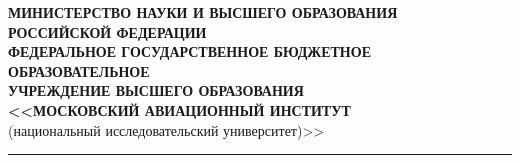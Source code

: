 \documentclass{article}
\begin{document}
\begin{center}


\begin{center}
\begin{minipage}{0.05\textwidth}%
    \resizebox{3cm}{!}{}
\end{minipage}
\hfill
\begin{minipage}{0.85\textwidth}\raggedleft
    \begin{center}
    \textbf{МИНИСТЕРСТВО НАУКИ И ВЫСШЕГО ОБРАЗОВАНИЯ\\ РОССИЙСКОЙ ФЕДЕРАЦИИ }\\
    \vspace{14pt}
    \textbf{ФЕДЕРАЛЬНОЕ ГОСУДАРСТВЕННОЕ БЮДЖЕТНОЕ ОБРАЗОВАТЕЛЬНОЕ\\
        УЧРЕЖДЕНИЕ ВЫСШЕГО ОБРАЗОВАНИЯ\\
    <<МОСКОВСКИЙ АВИАЦИОННЫЙ ИНСТИТУТ}\\ 
    (национальный исследовательский университет)>>
\end{center}
\end{minipage}
\end{center}
\vspace{14pt}
\rule{\textwidth}{2pt}\\

\vspace{14pt}

\begin{minipage}{\textwidth}




\end{minipage}


\end{center}
\end{document}
